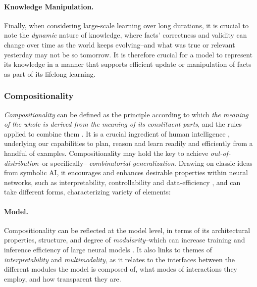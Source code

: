 \paragraph{Knowledge Manipulation.} Finally, when considering large-scale learning over long durations, it is crucial to note the \textit{dynamic} nature of knowledge, where facts' correctness and validity can change over time as the world keeps evolving--and what was true or relevant yesterday may not be so tomorrow. It is therefore crucial for a model to represent its knowledge in a manner that supports efficient update or manipulation of facts as part of its lifelong learning. 

\subsubsection{Compositionality}
\textit{Compositionality} can be defined as the principle according to which \textit{the meaning of the whole is derived from the meaning of its constituent parts}, and the rules applied to combine them \citep{compositionality,bottou}. It is a crucial ingredient of human intelligence \citep{humanthink}, underlying our capabilities to plan, reason and learn readily and efficiently from a handful of examples. Compositionality may hold the key to achieve \textit{out-of-distribution}--or specifically-- \textit{combinatorial generalization}.  Drawing on classic ideas from symbolic AI, it encourages and enhances desirable properties within neural networks, such as interpretability, controllability and data-efficiency  \citep{humanthink}, and can take different forms, characterizing variety of elements: 

\paragraph{Model.}
Compositionality can be reflected at the model level, in terms of its architectural properties, structure, and degree of \textit{modularity}--which can increase training and inference efficiency of large neural models \citep{moe}. It also links to themes of \textit{interpretability} and \textit{multimodality}, as it relates to the interfaces between the different modules the model is composed of, what modes of interactions they employ, and how transparent they are.

